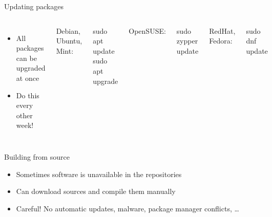     \begin{frame}[t,fragile]{Updating packages}
        \begin{columns}[T]
            \begin{itemize}
                \item All packages can be upgraded at once
                \item Do this every other week!
            \end{itemize}
            Debian, Ubuntu, Mint:
            \begin{bashenv}[\small]
sudo apt update
sudo apt upgrade
            \end{bashenv}
            OpenSUSE:
            \begin{bashenv}[\small]
sudo zypper update
            \end{bashenv}
            RedHat, Fedora:
            \begin{bashenv}[\small]
sudo dnf update
            \end{bashenv}
        \end{columns}
    \end{frame}

    \begin{frame}[t,fragile]{Building from source}
            \begin{itemize}
                \item Sometimes software is unavailable in the repositories
                \item Can download sources and compile them manually
                \item Careful! No automatic updates, malware, package manager
                    conflicts, \ldots
            \end{itemize}
    \end{frame}

